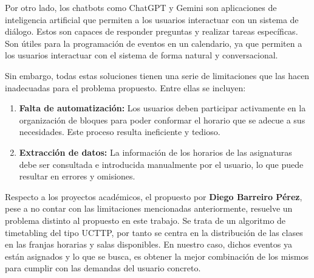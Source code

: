 Por otro lado, los chatbots como ChatGPT y Gemini son aplicaciones de inteligencia artificial que permiten a los usuarios interactuar con un sistema de diálogo. Estos son capaces de responder preguntas y realizar tareas específicas. Son útiles para la programación de eventos en un calendario, ya que permiten a los usuarios interactuar con el sistema de forma natural y conversacional.\newline

Sin embargo, todas estas soluciones tienen una serie de limitaciones que las hacen inadecuadas para el problema propuesto. Entre ellas se incluyen:

\begin{enumerate}
    \item \textbf{Falta de automatización:} Los usuarios deben participar activamente en la organización de bloques para poder conformar el horario que se adecue a sus necesidades. Este proceso resulta ineficiente y tedioso.
    \item \textbf{Extracción de datos:} La información de los horarios de las asignaturas debe ser consultada e introducida manualmente por el usuario, lo que puede resultar en errores y omisiones.
\end{enumerate}

Respecto a los proyectos académicos, el propuesto por \textbf{Diego Barreiro Pérez}, pese a no contar con las limitaciones mencionadas anteriormente, resuelve un problema distinto al propuesto en este trabajo. Se trata de un algoritmo de timetabling del tipo UCTTP, por tanto se centra en la distribución de las clases en las franjas horarias y salas disponibles. En nuestro caso, dichos eventos ya están asignados y lo que se busca, es obtener la mejor combinación de los mismos para cumplir con las demandas del usuario concreto.\newline